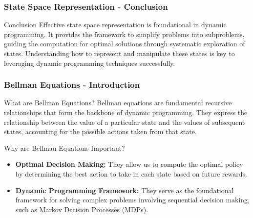 \documentclass[aspectratio=169]{beamer}
\begin{document}
\begin{frame}[fragile]
    \frametitle{State Space Representation - Conclusion}
    \begin{block}{Conclusion}
        Effective state space representation is foundational in dynamic programming. It provides the framework to simplify problems into subproblems, guiding the computation for optimal solutions through systematic exploration of states. Understanding how to represent and manipulate these states is key to leveraging dynamic programming techniques successfully.
    \end{block}
\end{frame}

\begin{frame}[fragile]
    \frametitle{Bellman Equations - Introduction}
    \begin{block}{What are Bellman Equations?}
        Bellman equations are fundamental recursive relationships that form the backbone of dynamic programming. They express the relationship between the value of a particular state and the values of subsequent states, accounting for the possible actions taken from that state.
    \end{block}
    \begin{block}{Why are Bellman Equations Important?}
        \begin{itemize}
            \item \textbf{Optimal Decision Making:} They allow us to compute the optimal policy by determining the best action to take in each state based on future rewards.
            \item \textbf{Dynamic Programming Framework:} They serve as the foundational framework for solving complex problems involving sequential decision making, such as Markov Decision Processes (MDPs).
        \end{itemize}
    \end{block}
\end{frame}
\end{document}
